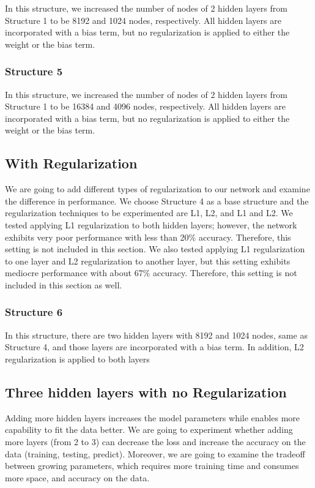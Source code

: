 \documentclass{article}
\begin{document}
In this structure, we increased the number of nodes of 2 hidden layers from Structure 1 to be 8192 and 1024 nodes, respectively. All hidden layers are incorporated with a bias term, but no regularization is applied to either the weight or the bias term.

\subsubsection{Structure 5}

In this structure, we increased the number of nodes of 2 hidden layers from Structure 1 to be 16384 and 4096 nodes, respectively. All hidden layers are incorporated with a bias term, but no regularization is applied to either the weight or the bias term.

\subsection{With Regularization}

We are going to add different types of regularization to our network and examine the difference in performance. We choose Structure 4 as a base structure and the regularization techniques to be experimented are L1, L2, and L1 and L2. We tested applying L1 regularization to both hidden layers; however, the network exhibits very poor performance with less than 20\% accuracy. Therefore, this setting is not included in this section. We also tested applying L1 regularization to one layer and L2 regularization to another layer, but this setting exhibits mediocre performance with about 67\% accuracy. Therefore, this setting is not included in this section as well.

\subsubsection{Structure 6}

In this structure, there are two hidden layers with 8192 and 1024 nodes, same as Structure 4, and those layers are incorporated with a bias term. In addition, L2 regularization is applied to both layers

\subsection{Three hidden layers with no Regularization}

Adding more hidden layers increases the model parameters while enables more capability to fit the data better. We are going to experiment whether adding more layers (from 2 to 3) can decrease the loss and increase the accuracy on the data (training, testing, predict). Moreover, we are going to examine the tradeoff between growing parameters, which requires more training time and consumes more space, and accuracy on the data.
\end{document}
